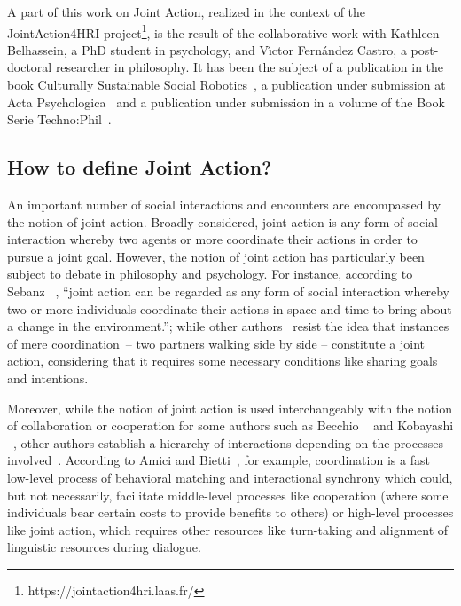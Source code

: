 \documentclass[a4paper,11pt,twoside]{StyleThese}
\begin{document}
A part of this work on Joint Action, realized in the context of the JointAction4HRI project\footnote{https://jointaction4hri.laas.fr/}, is the result of the collaborative work with Kathleen Belhassein, a PhD student in psychology, and V{\'\i}ctor Fern{\'a}ndez Castro, a post-doctoral researcher in philosophy. It has been the subject of a publication in the book Culturally Sustainable Social Robotics~\cite{belhassein_2020_horizontal}, a publication under submission at Acta Psychologica~\cite{belhassein_2021_adressing} and a publication under submission in a volume of the Book Serie Techno:Phil~\cite{castro_2021_adressing}.

\subsection{How to define Joint Action?}

An important number of social interactions and encounters are encompassed by the notion of joint action. Broadly considered, joint action is any form of social interaction whereby two agents or more coordinate their actions in order to pursue a joint goal. However, the notion of joint action has particularly been subject to debate in philosophy and psychology. For instance, according to Sebanz \etal~\cite[p.~70]{sebanz_2006_joint}, ``joint action can be regarded as
any form of social interaction whereby two or more individuals coordinate their actions in space and time to bring about a change in the environment.''; while other authors~\cite{carpenter_2009_just, cohen_1991_teamwork, fiebich_2013_joint, tomasello_2005_understanding,pacherie_2012_agency} resist the idea that instances of mere coordination – \eg two partners walking side by side – constitute a joint action, considering that it requires some necessary conditions like sharing goals and intentions.

Moreover, while the notion of joint action is used interchangeably with the notion of collaboration or cooperation for some authors such as Becchio \etal~\cite{becchio_2010_toward} and Kobayashi \etal~\cite{kobayashi_2018_language}, other authors establish a hierarchy of interactions depending on the processes involved~\cite{amici_2015_coordination, chalmeau_1995_cooperation}. According to Amici and Bietti~\cite{amici_2015_coordination}, for example, coordination is a fast low-level process of behavioral matching and interactional synchrony which could, but not necessarily, facilitate middle-level processes like cooperation (where some individuals bear certain costs to provide benefits to others) or high-level processes like joint action, which requires other resources like turn-taking and alignment of linguistic resources during dialogue.
\end{document}
